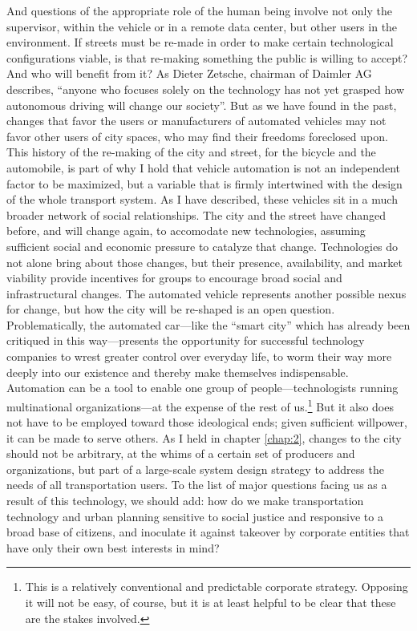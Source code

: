 And questions of the appropriate role of the human being involve not
only the supervisor, within the vehicle or in a remote data center,
but other users in the environment. If streets must be re-made in
order to make certain technological configurations viable, is that
re-making something the public is willing to accept? And who will
benefit from it? As Dieter Zetsche, chairman of Daimler AG describes,
``anyone who focuses solely on the technology has not yet grasped how 
autonomous driving will change our
society''\cite{???-http://www.slashgear.com/how-mercedes-f-015-self-driving-car-is-shaping-smart-cities-20374602/}.
But as we have found in the past, changes that favor the users or
manufacturers of automated vehicles may not favor other users of city
spaces, who may find their freedoms foreclosed upon. This history of
the re-making of the city and street, for the bicycle and the
automobile, is part of why I hold that vehicle automation is not an
independent factor to be maximized, but a variable that is firmly
intertwined with the design of the whole transport system.
As I have described, these vehicles sit in a much broader network of
social relationships. The city and the street have changed before, and
will change again, to accomodate new technologies, assuming sufficient
social and economic pressure to catalyze that change. Technologies do
not alone bring about those changes, but their presence, availability,
and market viability provide incentives for groups to encourage broad
social and infrastructural changes. The automated vehicle represents
another possible nexus for change, but how the city will be re-shaped
is an open question. Problematically, the automated car---like the
``smart city'' which has already been critiqued in this
way\cite{???}---presents the opportunity for successful technology
companies to wrest greater control over everyday life, to worm their
way more deeply into our existence and thereby make themselves
indispensable. Automation can be a tool to enable one group of
people---technologists running multinational organizations---at the
expense of the rest of us.\footnote{This is a relatively conventional and
predictable corporate strategy. Opposing it will not be easy, of
course, but it
is at least helpful to be clear that these are the stakes involved.}
But it also does not have to be employed toward those ideological
ends; given sufficient willpower, it can be made to serve others.
As I held in chapter \ref{chap:2}, changes to the city
should not be arbitrary, at the whims of a certain set of
producers and organizations, but part of a large-scale system design
strategy to address the needs of all transportation users. To the list
of major questions facing us as a result of this technology, we should
add: how do we make transportation technology and urban planning sensitive to social
justice and responsive to a broad base of citizens, and inoculate it
against takeover by corporate entities that have only their own best interests
in mind?
